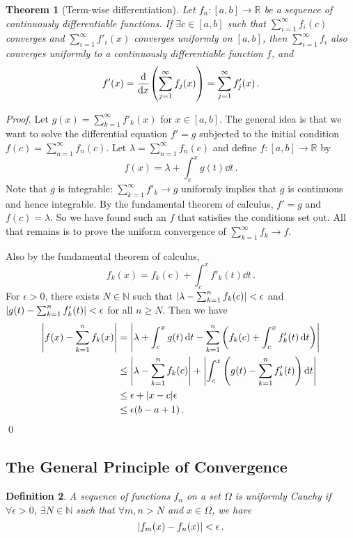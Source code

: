 \documentclass{article}
\theoremstyle{plain}\theoremheaderfont{\normalfont\itshape}\theorembodyfont{\rmfamily}\theoremseparator{.}\newtheorem*{rem}{Remark}\newtheorem*{ex}{Example}\newtheorem*{proof}{Proof}\newtheorem*{altp}{Alternative proof}
\theoremstyle{plain}\theoremheaderfont{\normalfont\bfseries}\theorembodyfont{\rmfamily}\theoremseparator{.}\newtheorem{thm}{Theorem}[section]\newtheorem{lem}[thm]{Lemma}\newtheorem{prop}[thm]{Proposition}\newtheorem*{cor}{Corollary}\newtheorem{defn}[thm]{Definition}\newtheorem{clm}[thm]{Claim}\newtheorem{clminproof}{Claim}
\theoremstyle{break}\theoremheaderfont{\normalfont\itshape}\theorembodyfont{\rmfamily}\theoremseparator{.\medskip}\newtheorem*{proofskip}{Proof}\newtheorem*{exs}{Examples}\newtheorem*{rems}{Remarks}
\theoremstyle{break}\theoremheaderfont{\normalfont\bfseries}\theorembodyfont{\rmfamily}\theoremseparator{.\medskip}\newtheorem{lemskip}[thm]{Lemma}\newtheorem{defnskip}[thm]{Definition}\newtheorem{propskip}[thm]{Proposition}\newtheorem{thmskip}[thm]{Theorem}
\newcommand{\qed}{\hfill\ensuremath{\Box}}
\begin{document}
    \begin{thm}[Term-wise differentiation]
        Let \(f_n:[a,b]\to\mathbb{R}\) be a sequence of continuously differentiable functions. If \(\exists c\in[a,b]\) such that \(\sum_{i=1}^{\infty}f_i(c)\) converges and \(\sum_{i=1}^{\infty}f'_i(x)\) converges uniformly on \([a,b]\), then \(\sum_{i=1}^{\infty}f_i\) also converges uniformly to a continuously differentiable function \(f\), and
        \[f'(x)=\dv{x}\qty(\sum_{j=1}^{\infty}f_j(x))=\sum_{j=1}^{\infty}f'_j(x)\,.\]
    \end{thm}
    \begin{proof}
        Let \(g(x)=\sum_{k=1}^{\infty}f'_k(x)\) for \(x\in[a,b]\). The general idea is that we want to solve the differential equation \(f'=g\) subjected to the initial condition \(f(c)=\sum_{n=1}^{\infty}f_n(c)\). Let \(\lambda=\sum_{n=1}^{\infty}f_n(c)\) and define \(f:[a,b]\to\mathbb{R}\) by
        \[f(x)=\lambda+\int_{c}^{x}g(t)\dd{t}\,.\]
        Note that \(g\) is integrable: \(\sum_{k=1}^{\infty}f'_k\to g\) uniformly implies that \(g\) is continuous and hence integrable. By the fundamental theorem of calculus, \(f'=g\) and \(f(c)=\lambda\). So we have found such an \(f\) that satisfies the conditions set out. All that remains is to prove the uniform convergence of \(\sum_{k=1}^{\infty}f_k\to f\).

        Also by the fundamental theorem of calculus,
        \[f_k(x)=f_k(c)+\int_{c}^{x}f'_k(t)\dd{t}\,.\]
        For \(\epsilon>0\), there exists \(N\in\mathbb{N}\) such that \(\abs{\lambda-\sum_{k=1}^{n}f_k(c)}<\epsilon\) and \(\abs{g(t)-\sum_{k=1}^{n}f_k'(t)}<\epsilon\) for all \(n\ge N\). Then we have
        \begin{align*}
            \abs{f(x)-\sum_{k=1}^{n}f_k(x)}&=\abs{\lambda+\int_{c}^{x}g(t)\dd{t}-\sum_{k=1}^{n}\qty(f_k(c)+\int_{c}^{x}f'_k(t)\dd{t})}\\
            &\le\abs{\lambda-\sum_{k=1}^{n}f_k(c)}+\abs{\int_{c}^{x}\qty(g(t)-\sum_{k=1}^{n}f'_k(t))\dd{t}}\\
            &\le\epsilon+\abs{x-c}\epsilon\\
            &\le\epsilon(b-a+1)\,.
        \end{align*}\qed
    \end{proof}

    \subsection{The General Principle of Convergence}
    \begin{defn}
        A sequence of functions \(f_n\) on a set \(\Omega\) is \textit{uniformly Cauchy} if \(\forall\epsilon>0\), \(\exists N\in\mathbb{N}\) such that \(\forall m,n> N\) and \(x\in\Omega\), we have
        \[\abs{f_m(x)-f_n(x)}<\epsilon\,.\] 
    \end{defn}
\end{document}
